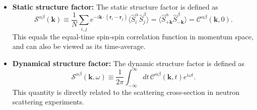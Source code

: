 \begin{itemize}
\begin{itemize}
        \begin{equation}
            \langle (S_{-\mathbf{k}}^{\beta} ( 0 ))^{\dagger} (S_{\mathbf{k}}^{\alpha} ( t ))^{\dagger} \rangle
            = 
            \begin{cases}
                \langle S_{\mathbf{k}}^{\bar{\beta}} (0) S_{-\mathbf{k}}^{\bar{\alpha}} (t) \rangle
                = \langle S_{\mathbf{k}}^{\bar{\beta}} (-t) S_{-\mathbf{k}}^{\bar{\alpha}} (0) \rangle
                = \mathcal{C}^{\bar{\beta}\bar{\alpha}}(-\mathbf{k}, -t), 
                & \text{if } \alpha,\beta = \pm, 0, \\[1em]
                \langle S_{\mathbf{k}}^{\beta} (0) S_{-\mathbf{k}}^{\alpha} (t) \rangle
                = \langle S_{\mathbf{k}}^{\beta} (-t) S_{-\mathbf{k}}^{\alpha} (0) \rangle 
                = \mathcal{C}^{\beta\alpha}(-\mathbf{k}, -t), 
                & \text{if } \alpha, \beta = x, y, z.
            \end{cases}
        \end{equation}
        where in the second equality we use the identity $\langle \hat{A}(0) \hat{B}(t) \rangle = \langle \hat{A}(-t) \hat{B}(0) \rangle$ for thermal states $\rho = e^{-\beta H}/Z$:
        \begin{equation}
            \langle \hat{A}(0) \hat{B}(t) \rangle
            = \Tr[\rho \hat{A} \hat{U}^{\dagger}_{t} \hat{B} \hat{U}_{t}] 
            = \Tr[\rho \hat{U}_{t} \hat{A} \hat{U}^{\dagger}_{t} \hat{B}(0)]  
            = \langle \hat{A}(-t) \hat{B}(0) \rangle.
        \end{equation}
    \end{itemize}
    
    \item \textbf{Static structure factor:}
    The static structure factor is defined as
    \begin{equation}
        \mathcal{S}^{\alpha\beta}(\mathbf{k}) 
        \equiv
        \frac{1}{N} \sum_{i,j} e^{-i \mathbf{k} \cdot (\mathbf{r}_{i} - \mathbf{r}_{j})} 
        \big\langle \hat{S}^{\alpha}_{i} \hat{S}^{\beta}_{j} \big\rangle
        = \big\langle \hat{S}_{+ \mathbf{k}}^{\alpha} \hat{S}_{- \mathbf{k}}^{\beta} \big\rangle 
        = \mathcal{C}^{\alpha\beta}(\mathbf{k}, 0).
    \end{equation}
    This equals the equal-time spin-spin correlation function in momentum space, and can also be viewed as its time-average.

    
    \item \textbf{Dynamical structure factor:}
    The dynamic structure factor is defined as 
    \begin{equation}
        \mathcal{S}^{\alpha\beta}(\mathbf{k}, \omega) 
        \equiv \frac{1}{2\pi} \int_{-\infty}^{\infty} dt \, \mathcal{C}^{\alpha\beta}(\mathbf{k}, t) e^{i \omega t}.
    \end{equation}
    This quantity is directly related to the scattering cross-section in neutron scattering experiments.



\end{itemize}
